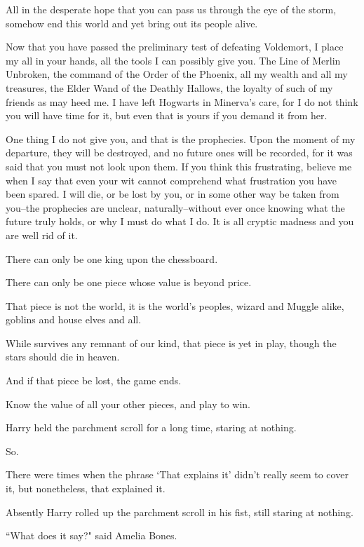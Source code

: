 \begin{writtenNote}
All in the desperate hope that you can pass us through the eye of the storm, somehow end this world and yet bring out its people alive.

Now that you have passed the preliminary test of defeating Voldemort, I place my all in your hands, all the tools I can possibly give you. The Line of Merlin Unbroken, the command of the Order of the Phoenix, all my wealth and all my treasures, the Elder Wand of the Deathly Hallows, the loyalty of such of my friends as may heed me. I have left Hogwarts in Minerva's care, for I do not think you will have time for it, but even that is yours if you demand it from her.

One thing I do not give you, and that is the prophecies. Upon the moment of my departure, they will be destroyed, and no future ones will be recorded, for it was said that you must not look upon them. If you think this frustrating, believe me when I say that even your wit cannot comprehend what frustration you have been spared. I will die, or be lost by you, or in some other way be taken from you\---the prophecies are unclear, naturally\---without ever once knowing what the future truly holds, or why I must do what I do. It is all cryptic madness and you are well rid of it.

There can only be one king upon the chessboard.

There can only be one piece whose value is beyond price.

That piece is not the world, it is the world's peoples, wizard and Muggle alike, goblins and house elves and all.

While survives any remnant of our kind, that piece is yet in play, though the stars should die in heaven.

And if that piece be lost, the game ends.

Know the value of all your other pieces, and play to win.

\end{writtenNote}

\later

Harry held the parchment scroll for a long time, staring at nothing.

So.

There were times when the phrase `That explains it' didn't really seem to cover it, but nonetheless, that explained it.

Absently Harry rolled up the parchment scroll in his fist, still staring at nothing.

``What does it say?" said Amelia Bones.

